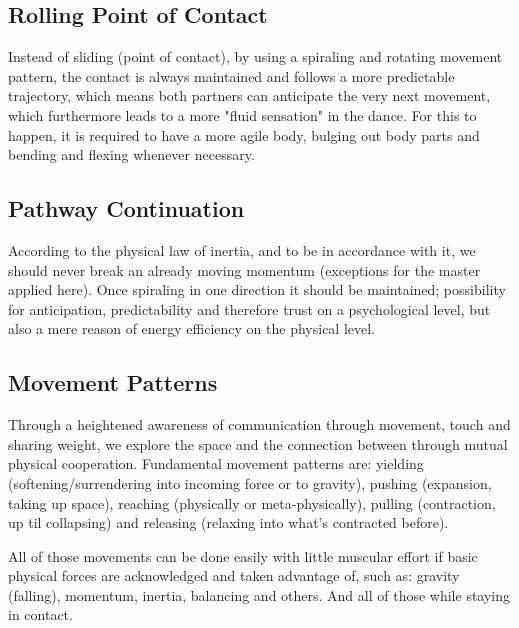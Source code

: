 \subsection{Rolling Point of Contact}

Instead of sliding (point of contact), by using a spiraling and rotating movement pattern, the contact is always maintained and follows a more predictable trajectory, which means both partners can anticipate the very next movement, which furthermore leads to a more "fluid sensation" in the dance. For this to happen, it is required to have a more agile body, bulging out body parts and bending and flexing whenever necessary.

\subsection{Pathway Continuation}

According to the physical law of inertia, and to be in accordance with it, we should never break an already moving momentum (exceptions for the master applied here). Once spiraling in one direction it should be maintained; possibility for anticipation, predictability and therefore trust on a psychological level, but also a mere reason of energy efficiency on the physical level.

\subsection{Movement Patterns}

Through a heightened awareness of communication through movement, touch and sharing weight, we explore the space and the connection between through mutual physical cooperation. Fundamental movement patterns are: yielding (softening/surrendering into incoming force or to gravity), pushing (expansion, taking up space), reaching (physically or meta-physically), pulling (contraction, up til collapsing) and releasing (relaxing into what's contracted before).

All of those movements can be done easily with little muscular effort if basic physical forces are acknowledged and taken advantage of, such as: gravity (falling), momentum, inertia, balancing and others. And all of those while staying in contact.